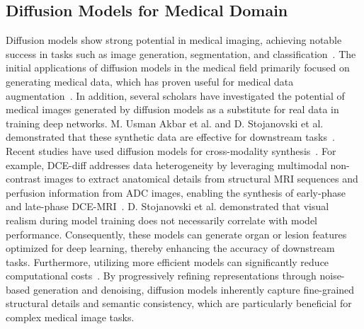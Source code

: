\subsection{Diffusion Models for Medical Domain}
Diffusion models show strong potential in medical imaging, achieving notable success in tasks such as image generation, segmentation, and classification~\cite{YAN2024112350, zhu2024diffusion, fontanella2024diffusion}. The initial applications of diffusion models in the medical field primarily focused on generating medical data, which has proven useful for medical data augmentation~\cite{kazerouni2023diffusion}. In addition, several scholars have investigated the potential of medical images generated by diffusion models as a substitute for real data in training deep networks. M. Usman Akbar et al. and D. Stojanovski et al. demonstrated that these synthetic data are effective for downstream tasks~\cite{usman2024brain, stojanovski2024efficient}. Recent studies have used diffusion models for cross-modality synthesis~\cite{luo2024target, pan2024synthetic}. For example, DCE-diff addresses data heterogeneity by leveraging multimodal non-contrast images to extract anatomical details from structural MRI sequences and perfusion information from ADC images, enabling the synthesis of early-phase and late-phase DCE-MRI~\cite{ramanarayanan2024dce}. D. Stojanovski et al. demonstrated that visual realism during model training does not necessarily correlate with model performance. Consequently, these models can generate organ or lesion features optimized for deep learning, thereby enhancing the accuracy of downstream tasks. Furthermore, utilizing more efficient models can significantly reduce computational costs~\cite{stojanovski2024efficient}. By progressively refining representations through noise-based generation and denoising, diffusion models inherently capture fine-grained structural details and semantic consistency, which are particularly beneficial for complex medical image tasks.

